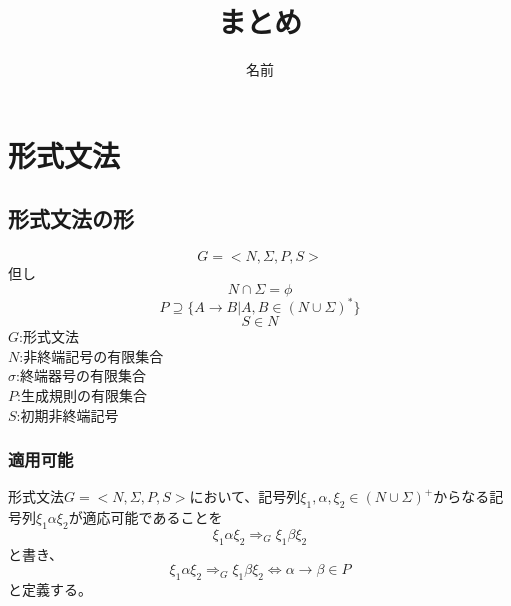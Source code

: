 \documentclass[a4paper]{jarticle}
\title{まとめ}
\author{名前}
\begin{document}
\maketitle
\section{}
\section{}
\section{}
\section{}
\section{形式文法}
\subsection{形式文法の形}
\begin{equation}
G = < N , \Sigma , P , S >
\end{equation}
但し
\begin{equation}
N \cap \Sigma = \phi
\end{equation}
\begin{equation}
P \supseteq \bigl\{ A \to B | A , B \in \left( N \cup \Sigma \right) ^* \bigr\}
\end{equation}
\begin{equation}
S \in N
\end{equation}
$G$:形式文法\\
$N$:非終端記号の有限集合\\
$\sigma$:終端器号の有限集合\\
$P$:生成規則の有限集合\\
$S$:初期非終端記号
\subsubsection{適用可能}
形式文法$ G = < N , \Sigma , P , S > $において、記号列$ \xi _1 , \alpha , \xi _2 \in \left( N \cup \Sigma \right) ^+ $からなる記号列$ \xi _1 \alpha \xi _2 $が適応可能であることを
\begin{equation}
\xi _1 \alpha \xi _2 \Rightarrow _G \xi _1 \beta \xi _2
\end{equation}
と書き、
\begin{equation}
\xi _1 \alpha \xi _2 \Rightarrow _G \xi _1 \beta \xi _2 \iff \alpha \to \beta \in P
\end{equation}
と定義する。
\end{document}

